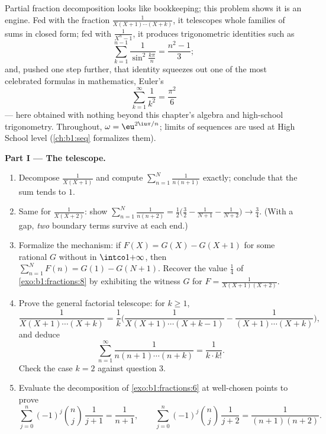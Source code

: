 \begin{problem}\label{pb:b1:fractions:1}
Partial fraction decomposition looks like bookkeeping; this problem
shows it is an engine. Fed with the fraction
$\frac1{X(X+1)\cdots(X+k)}$, it telescopes whole families of sums
in closed form; fed with $\frac1{X^n - 1}$, it produces
trigonometric identities such as
\[
\sum_{k=1}^{n-1}\frac{1}{\sin^2\frac{k\pi}{n}} = \frac{n^2-1}{3} ;
\]
and, pushed one step further, that identity squeezes out one of the
most celebrated formulas in mathematics, Euler's
\[
\sum_{k=1}^{\infty}\frac1{k^2} = \frac{\pi^2}{6}
\]
--- here obtained with nothing beyond this chapter's algebra and
high-school trigonometry.
Throughout, $\omega = \eu^{2\iu\pi/n}$; limits of sequences are
used at High School level (\cref{ch:b1:seq} formalizes them).

\medskip
\noindent\textbf{Part I --- The telescope.}
\begin{enumerate}
  \item Decompose $\frac1{X(X+1)}$ and compute $\sum_{n=1}^{N}
        \frac1{n(n+1)}$ exactly; conclude that the sum tends to
        $1$.
  \item Same for $\frac1{X(X+2)}$: show $\sum_{n=1}^{N}
        \frac1{n(n+2)} = \frac12\bigl(\frac32 - \frac1{N+1} -
        \frac1{N+2}\bigr) \to \frac34$. (With a gap, \emph{two}
        boundary terms survive at each end.)
  \item Formalize the mechanism: if $F(X) = G(X) - G(X+1)$ for
        some rational $G$ without  in $\intco1{+\infty}$,
        then $\sum_{n=1}^N F(n) = G(1) - G(N+1)$. Recover the
        value $\frac14$ of \cref{exo:b1:fractions:8} by exhibiting
        the witness $G$ for $F = \frac1{X(X+1)(X+2)}$.
  \item Prove the general factorial telescope: for $k \geq 1$,
        \[
        \frac{1}{X(X+1)\cdots(X+k)}
        = \frac1k\biggl(\frac{1}{X(X+1)\cdots(X+k-1)}
        - \frac{1}{(X+1)\cdots(X+k)}\biggr),
        \]
        and deduce
        \[
        \sum_{n=1}^{\infty}\frac{1}{n(n+1)\cdots(n+k)}
        = \frac{1}{k \cdot k!} .
        \]
        Check the case $k = 2$ against question 3.
  \item Evaluate the decomposition of \cref{exo:b1:fractions:6}
        at well-chosen points to prove
        \[
        \sum_{j=0}^{n}(-1)^j\binom nj\,\frac1{j+1}
        = \frac1{n+1},
        \qquad
        \sum_{j=0}^{n}(-1)^j\binom nj\,\frac1{j+2}
        = \frac1{(n+1)(n+2)} .
        \]
\end{enumerate}


\end{problem}
